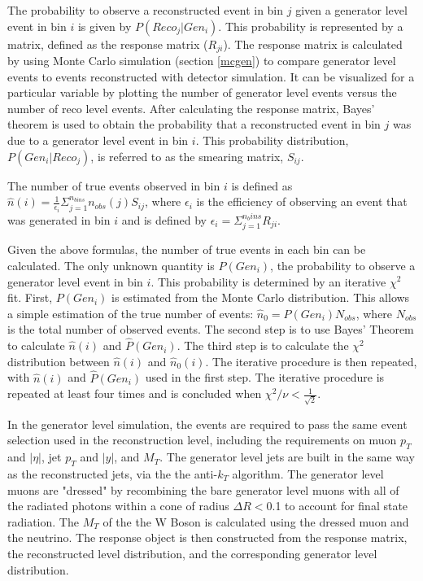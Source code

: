 \documentclass[oneside, letterpaper, oldfontcommands]{memoir}
\begin{document}
\qquad The probability to observe a reconstructed event in bin $j$ given a generator level event in bin $i$ is given by $P(Reco_{j}|Gen_{i})$. This probability is represented by a matrix, defined as the response matrix ($R_{ji}$). The response matrix is calculated by using Monte Carlo simulation (section \ref{mcgen}) to compare generator level events to events reconstructed with detector simulation. It can be visualized for a particular variable by plotting the number of generator level events versus the number of reco level events. After calculating the response matrix, Bayes' theorem is used to obtain the probability that a reconstructed event in bin $j$ was due to a generator level event in bin $i$. This probability distribution, $P(Gen_{i}|Reco_{j})$, is referred to as the smearing matrix, $S_{ij}$.

\qquad The number of true events observed in bin $i$ is defined as $\hat{n}(i) = \frac{1}{\epsilon_{i}}\Sigma_{j=1}^{n_{bins}}n_{obs}(j)S_{ij}$, where $\epsilon_{i}$ is the efficiency of observing an event that was generated in bin $i$ and is defined by $\epsilon_{i}=\Sigma_{j=1}^{n_bins}R_{ji}$.

\qquad Given the above formulas, the number of true events in each bin can be calculated. The only unknown quantity is $P(Gen_{i})$, the probability to observe a generator level event in bin $i$. This probability is determined by an iterative $\chi^2$ fit. First, $P(Gen_{i})$ is estimated from the Monte Carlo distribution. This allows a simple estimation of the true number of events: $\hat{n}_{0} = P(Gen_{i})N_{obs}$, where $N_{obs}$ is the total number of observed events. The second step is to use Bayes' Theorem to calculate $\hat{n}(i)$ and $\hat{P}(Gen_{i})$. The third step is to calculate the $\chi^{2}$ distribution between $\hat{n}(i)$ and $\hat{n}_{0}(i)$. The iterative procedure is then repeated, with $\hat{n}(i)$ and $\hat{P}(Gen_{i})$ used in the first step. The iterative procedure is repeated at least four times and is concluded when $\chi^{2}/\nu < \frac{1}{\sqrt{2}}$.

\qquad In the generator level simulation, the events are required to pass the same event selection used in the reconstruction level, including the requirements on muon $p_{T}$ and $|\eta|$, jet $p_{T}$ and $|y|$, and $M_{T}$. The generator level jets are built in the same way as the reconstructed jets, via the the anti-$k_{T}$ algorithm. The generator level muons are "dressed" by recombining the bare generator level muons with all of the radiated photons within a cone of radius $\Delta R <$0.1 to account for final state radiation. The $M_{T}$ of the the W Boson is calculated using the dressed muon and the neutrino. The response object is then constructed from the response matrix, the reconstructed level distribution, and the corresponding generator level distribution. 
\end{document}
